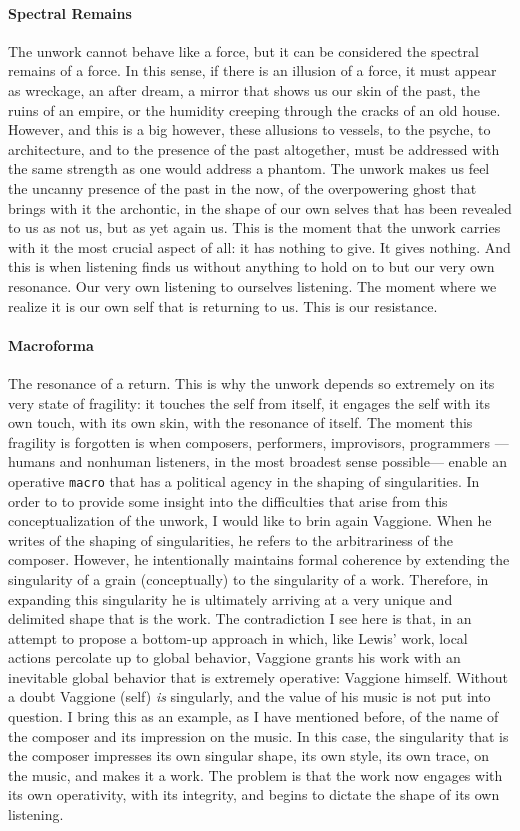 \paragraph{Spectral Remains}
The unwork cannot behave like a force, but it can be considered the spectral remains of a force. In this sense, if there is an illusion of a force, it must appear as wreckage, an after dream, a mirror that shows us our skin of the past, the ruins of an empire, or the humidity creeping through the cracks of an old house. However, and this is a big however, these allusions to vessels, to the psyche, to architecture, and to the presence of the past altogether, must be addressed with the same strength as one would address a phantom. The unwork makes us feel the uncanny presence of the past in the now, of the overpowering ghost that brings with it the archontic, in the shape of our own selves that has been revealed to us as not us, but as yet again us. This is the moment that the unwork carries with it the most crucial aspect of all: it has nothing to give. It gives nothing. And this is when listening finds us without anything to hold on to but our very own resonance. Our very own listening to ourselves listening. The moment where we realize it is our own self that is returning to us. This is our resistance.

\paragraph{Macroforma}
The resonance of a return. This is why the unwork depends so extremely on its very state of fragility: it touches the self from itself, it engages the self with its own touch, with its own skin, with the resonance of itself. The moment this fragility is forgotten is when composers, performers, improvisors, programmers ---humans and nonhuman listeners, in the most broadest sense possible--- enable an operative \texttt{macro} that has a political agency in the shaping of singularities. In order to to provide some insight into the difficulties that arise from this conceptualization of the unwork, I would like to brin again Vaggione. When he writes of the shaping of singularities, he refers to the arbitrariness of the composer. However, he intentionally maintains formal coherence by extending the singularity of a grain (conceptually) to the singularity of a work. Therefore, in expanding this singularity he is ultimately arriving at a very unique and delimited shape that is the work. The contradiction I see here is that, in an attempt to propose a bottom-up approach in which, like Lewis' work, local actions percolate up to global behavior, Vaggione grants his work with an inevitable global behavior that is extremely operative: Vaggione himself. Without a doubt Vaggione (self) \textit{is} singularly, and the value of his music is not put into question. I bring this as an example, as I have mentioned before, of the name of the composer and its impression on the music. In this case, the singularity that is the composer impresses its own singular shape, its own style, its own trace, on the music, and makes it a work. The problem is that the work now engages with its own operativity, with its integrity, and begins to dictate the shape of its own listening.

